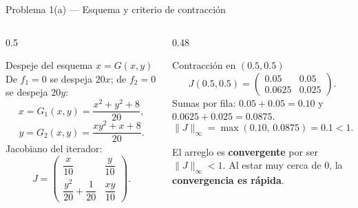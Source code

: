 \documentclass[aspectratio=169,10pt]{beamer}
\begin{document}
\begin{frame}{Problema 1(a) — Esquema y criterio de contracción}
\begin{columns}[T]
\begin{column}{0.5\textwidth}
\begin{cardgear}{Despeje del esquema $x=G(x,y)$}{\faSuperscript}
{\footnotesize De $f_1=0$ se despeja $20x$; de $f_2=0$ se despeja $20y$:
\[
x=G_1(x,y)=\frac{x^{2}+y^{2}+8}{20},
\]
\[
y=G_2(x,y)=\frac{xy^{2}+x+8}{20}.
\]
Jacobiano del iterador:
\[
J=\begin{pmatrix}\dfrac{x}{10} & \dfrac{y}{10}\\[2mm] \dfrac{y^{2}}{20}+\dfrac1{20} & \dfrac{xy}{10}\end{pmatrix}.
\]}
\end{cardgear}
\end{column}
\begin{column}{0.48\textwidth}
\begin{cardgear}{Contracción en $(0.5,0.5)$}{\faRulerHorizontal}
{\footnotesize
\[
J(0.5,0.5)=\begin{pmatrix}0.05 & 0.05\\ 0.0625 & 0.025\end{pmatrix}.
\]
Sumas por fila: $0.05+0.05=0.10$ y $0.0625+0.025=0.0875$.
\[
\lVert J\rVert_\infty=\max(0.10,\,0.0875)=0.1<1.
\]}
\end{cardgear}
\vspace{1mm}
\begin{cardnota}[\faCheckCircle]
{\footnotesize El arreglo es \textbf{convergente} por ser $\lVert J\rVert_\infty<1$. Al estar muy cerca de $0$, la \textbf{convergencia es rápida}.}
\end{cardnota}
\end{column}
\end{columns}
\end{frame}
\end{document}
